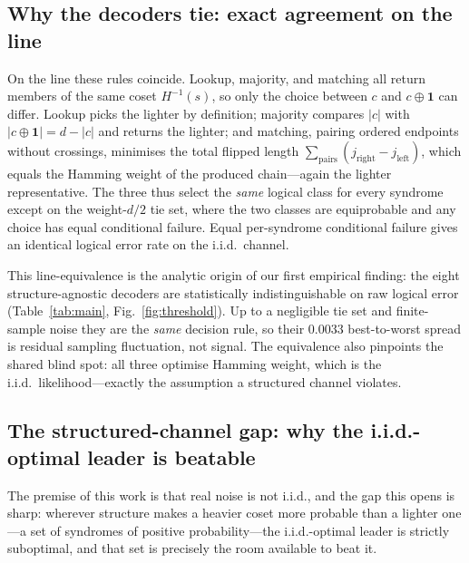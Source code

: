 \documentclass[reprint,aps,prxquantum,amsmath,amssymb,floatfix,nofootinbib,longbibliography]{revtex4-2}
\theoremstyle{definition}
\theoremstyle{remark}
\theoremstyle{plain}
\newcommand{\abs}[1]{\left\lvert #1 \right\rvert}
\newcommand{\sync}[1]{#1}
\begin{document}
\subsection{Why the decoders tie: exact agreement on the line}
\label{sec:theory_tie}

On the line these rules coincide. Lookup, majority, and matching all return members of the same coset $H^{-1}(s)$, so only the choice between $c$ and $c\oplus\mathbf 1$ can differ. Lookup picks the lighter by definition; majority compares $\abs c$ with $\abs{c\oplus\mathbf 1}=d-\abs c$ and returns the lighter; and matching, pairing ordered endpoints without crossings, minimises the total flipped length $\sum_{\text{pairs}}(j_{\text{right}}-j_{\text{left}})$, which equals the Hamming weight of the produced chain---again the lighter representative. The three thus select the \emph{same} logical class for every syndrome except on the weight-$d/2$ tie set, where the two classes are equiprobable and any choice has equal conditional failure. Equal per-syndrome conditional failure gives an identical logical error rate on the i.i.d.\ channel.

This line-equivalence is the analytic origin of our first empirical finding: the eight structure-agnostic decoders are statistically indistinguishable on raw logical error (Table~\ref{tab:main}, Fig.~\ref{fig:threshold}). Up to a negligible tie set and finite-sample noise they are the \emph{same} decision rule, so their $\sync{0.0033}$ best-to-worst spread is residual sampling fluctuation, not signal. The equivalence also pinpoints the shared blind spot: all three optimise Hamming weight, which is the i.i.d.\ likelihood---exactly the assumption a structured channel violates.

\subsection{The structured-channel gap: why the i.i.d.-optimal leader is beatable}
\label{sec:theory_structured}

The premise of this work is that real noise is not i.i.d., and the gap this opens is sharp: wherever structure makes a heavier coset more probable than a lighter one---a set of syndromes of positive probability---the i.i.d.-optimal leader is strictly suboptimal, and that set is precisely the room available to beat it.
\end{document}
